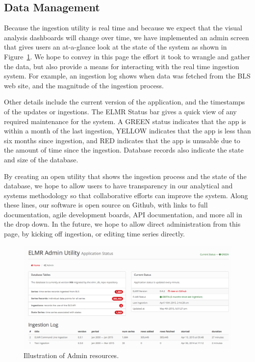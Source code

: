\documentclass{sigchi}
\begin{document}
{\subsection{Data Management}

Because the ingestion utility is real time and because we expect that the visual analysis dashboards will change over time, we have implemented an admin screen that gives users an at-a-glance look at the state of the system as shown in Figure~\ref{fig:admin}. We hope to convey in this page the effort it took to wrangle and gather the data, but also provide a means for interacting with the real time ingestion system. For example, an ingestion log shows when data was fetched from the BLS web site, and the magnitude of the ingestion process.

Other details include the current version of the application, and the timestamps of the updates or ingestions. The ELMR Status bar gives a quick view of any required maintenance for the system. A GREEN status indicates that the app is within a month of the last ingestion, YELLOW indicates that the app is less than six months since ingestion, and RED indicates that the app is unusable due to the amount of time since the ingestion. Database records also indicate the state and size of the database.

By creating an open utility that shows the ingestion process and the state of the database, we hope to allow users to have transparency in our analytical and systems methodology so that collaborative efforts can improve the system. Along these lines, our software is open source on Github, with links to full documentation, agile development boards, API documentation, and more all in the drop down. In the future, we hope to allow direct administration from this page, by kicking off ingestion, or editing time series directly.}

\begin{figure}[!ht]
    \centering
    \includegraphics[width=1.75\columnwidth]{figures/Admin.png}
    \caption{Illustration of Admin resources.}
    \label{fig:admin}
\end{figure}
\end{document}
